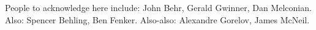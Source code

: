 

\clearpage
\begin{acknowledgement}
People to acknowledge here include:  John Behr, Gerald Gwinner, Dan Melconian.  Also:  Spencer Behling, Ben Fenker.  Also-also: Alexandre Gorelov, James McNeil.  
\end{acknowledgement}
